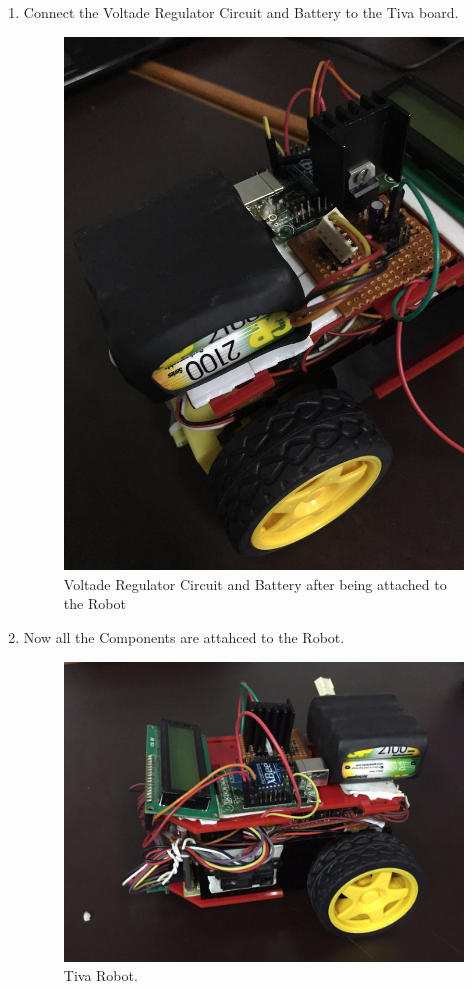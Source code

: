 \documentclass[a4paper,12pt,oneside]{book}
\begin{document}
\begin{enumerate}
\item Connect the Voltade Regulator Circuit and Battery to the Tiva board.
\begin{figure}[h]
        \centering
        \includegraphics[scale=0.16]{battery_a}
        \caption{ Voltade Regulator Circuit and Battery  after being attached to the Robot}
      \end{figure}

\item Now all the Components are attahced to the Robot.
\begin{figure}[h]
        \centering
        \includegraphics[scale=0.16]{robot}
        \caption{Tiva Robot.}
      \end{figure}
    \newpage
\end{enumerate}
\end{document}
